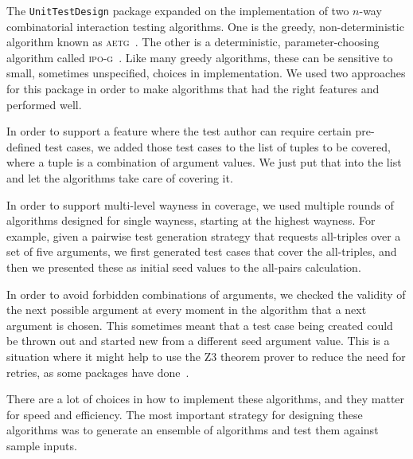 \documentclass{juliacon}
\newcommand{\utd}{\texttt{UnitTestDesign}\xspace}
\begin{document}
\vskip 6pt
The \utd package expanded on the implementation of two $n$-way combinatorial interaction testing algorithms. One is the greedy, non-deterministic algorithm known as \textsc{aetg}~\cite{Cohen1997-lb}. The other is a deterministic, parameter-choosing algorithm called \textsc{ipo-g}~\cite{Lei2008-xt}. Like many greedy algorithms, these can be sensitive to small, sometimes unspecified, choices in implementation. We used two approaches for this package in order to make algorithms that had the right features and performed well.

\vskip 6pt
In order to support a feature where the test author can require certain pre-defined test cases, we added those test cases to the list of tuples to be covered, where a tuple is a combination of argument values. We just put that into the list and let the algorithms take care of covering it.

\vskip 6pt
In order to support multi-level wayness in coverage, we used multiple rounds of algorithms designed for single wayness, starting at the highest wayness. For example, given a pairwise test generation strategy that requests all-triples over a set of five arguments, we first generated test cases that cover the all-triples, and then we presented these as initial seed values to the all-pairs calculation.

\vskip 6pt
In order to avoid forbidden combinations of arguments, we checked the validity of the next possible argument at every moment in the algorithm that a next argument is chosen. This sometimes meant that a test case being created could be thrown out and started new from a different seed argument value. This is a situation where it might help to use the Z3 theorem prover to reduce the need for retries, as some packages have done~\cite{Nie2011-yl}.

\vskip 6pt
There are a lot of choices in how to implement these algorithms, and they matter for speed and efficiency. The most important strategy for designing these algorithms was to generate an ensemble of algorithms and test them against sample inputs.
\end{document}
